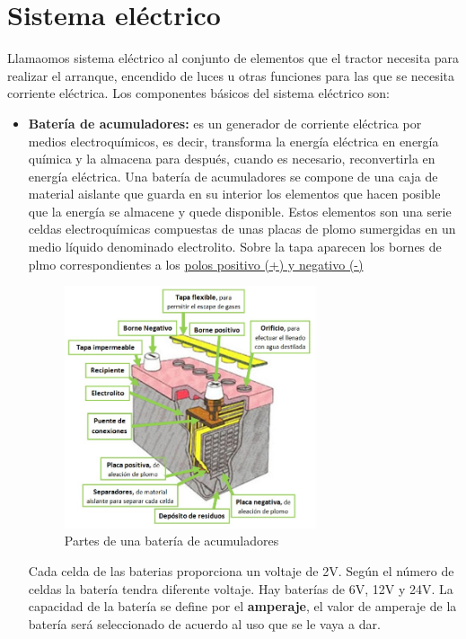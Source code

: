\documentclass[a4paper,12pt,oneside]{book}
\begin{document}
\section{Sistema eléctrico}
\label{sec:org8ddcd54}

Llamaomos sistema eléctrico al conjunto de elementos que el tractor necesita
para realizar el arranque, encendido de luces u otras funciones para las que se
necesita corriente eléctrica. Los componentes básicos del sistema eléctrico son:
\begin{itemize}
\item \textbf{Batería de acumuladores:} es un generador de corriente eléctrica por medios
electroquímicos, es decir, transforma la energía eléctrica en energía química
y la almacena para después, cuando es necesario, reconvertirla en energía
eléctrica. Una batería de acumuladores se compone de una caja de material
aislante que guarda en su interior los elementos que hacen posible que la
energía se almacene y quede disponible. Estos elementos son una serie celdas
electroquímicas compuestas de unas placas de plomo sumergidas en un medio
líquido denominado electrolito. Sobre la tapa aparecen los bornes de plmo
correspondientes a los \uline{polos positivo (+) y negativo (-)}
 \begin{figure}[htbp]
\centering
\includegraphics[width=0.7\textwidth]{./img_0009/bateria_partes.jpg}
\caption{Partes de una batería de acumuladores}
\end{figure}
 Cada celda de las baterias proporciona un voltaje de 2V. Según el número de
celdas la batería tendra diferente voltaje. Hay baterías de 6V, 12V y 24V. La
capacidad de la batería se define por el \textbf{amperaje}, el valor de amperaje de
la batería será seleccionado de acuerdo al uso que se le vaya a dar.
\end{itemize}
\vspace{3cm}
\end{document}
